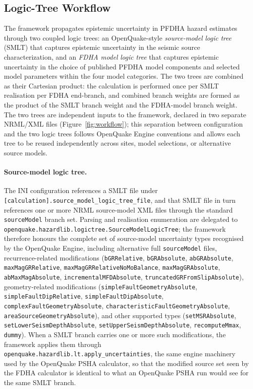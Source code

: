 \subsection{Logic-Tree Workflow}
\label{sec:architecture:logic_tree}
The framework propagates epistemic uncertainty in PFDHA hazard estimates through two coupled logic trees: an OpenQuake-style \emph{source-model logic tree} (SMLT) that captures epistemic uncertainty in the seismic source characterization, and an \emph{FDHA model logic tree} that captures epistemic uncertainty in the choice of published PFDHA model components and selected model parameters within the four model categories. The two trees are combined as their Cartesian product: the calculation is performed once per SMLT realisation per FDHA end-branch, and combined branch weights are formed as the product of the SMLT branch weight and the FDHA-model branch weight. The two trees are independent inputs to the framework, declared in two separate NRML/XML files (Figure~\ref{fig:workflow}); this separation between configuration and the two logic trees follows OpenQuake Engine conventions \citep{Pagani2014} and allows each tree to be reused independently across sites, model selections, or alternative source models.

\paragraph{Source-model logic tree.}
\label{sec:architecture:smlt}
The INI configuration references a SMLT file under \texttt{[calculation].source\_model\_logic\_tree\_file}, and that SMLT file in turn references one or more NRML source-model XML files through the standard \texttt{sourceModel} branch set. Parsing and realisation enumeration are delegated to \texttt{openquake.hazardlib.logictree.SourceModelLogicTree}; the framework therefore honours the complete set of source-model uncertainty types recognised by the OpenQuake Engine, including alternative full \texttt{sourceModel} files, recurrence-related modifications (\texttt{bGRRelative}, \texttt{bGRAbsolute}, \texttt{abGRAbsolute}, \texttt{maxMagGRRelative}, \texttt{maxMagGRRelativeNoMoBalance}, \texttt{maxMagGRAbsolute}, \texttt{abMaxMagAbsolute}, \texttt{incrementalMFDAbsolute}, \texttt{truncatedGRFromSlipAbsolute}), geometry-related modifications (\texttt{simpleFaultGeometryAbsolute}, \texttt{simpleFaultDipRelative}, \texttt{simpleFaultDipAbsolute}, \texttt{complexFaultGeometryAbsolute}, \texttt{characteristicFaultGeometryAbsolute}, \texttt{areaSourceGeometryAbsolute}), and other supported types (\texttt{setMSRAbsolute}, \texttt{setLowerSeismDepthAbsolute}, \texttt{setUpperSeismDepthAbsolute}, \texttt{recomputeMmax}, \texttt{dummy}). When a SMLT branch carries one or more such modifications, the framework applies them through \texttt{openquake.hazardlib.lt.apply\_uncertainties}, the same engine machinery used by the OpenQuake PSHA calculator, so that the modified source set seen by the FDHA calculator is identical to what an OpenQuake PSHA run would see for the same SMLT branch.

